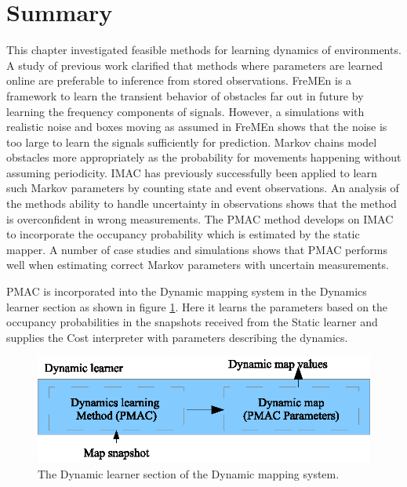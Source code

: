 \section{Summary}
This chapter investigated feasible methods for learning dynamics of environments.
A study of previous work clarified that methods where parameters are learned online are preferable to inference from stored observations.
FreMEn is a framework to learn the transient behavior of obstacles far out in future by learning the frequency components of signals.
However, a simulations with realistic noise and boxes moving as assumed in FreMEn shows that the noise is too large to learn the signals sufficiently for prediction.
Markov chains model obstacles more appropriately as the probability for movements happening without assuming periodicity.
IMAC has previously successfully been applied to learn such Markov parameters by counting state and event observations.
An analysis of the methods ability to handle uncertainty in observations shows that the method is overconfident in wrong measurements.
The PMAC method develops on IMAC to incorporate the occupancy probability which is estimated by the static mapper.
A number of case studies and simulations shows that PMAC performs well when estimating correct Markov parameters with uncertain measurements. 

PMAC is incorporated into the Dynamic mapping system in the Dynamics learner section as shown in figure \ref{fig:dynamic_learner_detail}.
Here it learns the parameters based on the occupancy probabilities in the snapshots received from the Static learner and supplies the Cost interpreter with parameters describing the dynamics. 

\begin{figure}[htbp]
	\centering
	\includegraphics[scale=1]{chapters/mapping_of_dynamic_areas/figures/dynamic_detail.eps}
	\caption{The Dynamic learner section of the Dynamic mapping system.}
	\label{fig:dynamic_learner_detail}
\end{figure}